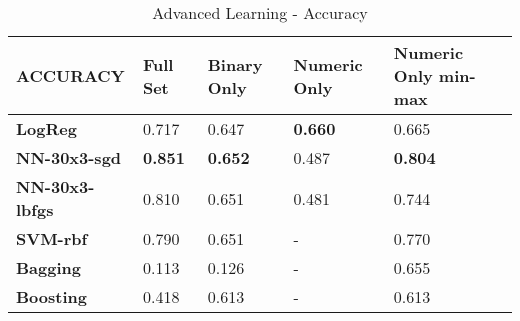 \documentclass[10pt, conference, compsocconf]{IEEEtran}
\begin{document}
\begin{center}
	\begin{table}[h]
		\centering \footnotesize
		\vspace{0.01cm}
		\caption{Advanced Learning - Accuracy}
		\hspace{1cm}
		\begin{tabularx}{\linewidth}{ l  X  X  X  X }
			\hline
			\textbf{ACCURACY} &	\textbf{Full Set}&	\textbf{Binary Only}&	\textbf{Numeric Only}&	\textbf{Numeric Only min-max} \\ \hline
			
			
			\textbf{LogReg}&	0.717&	0.647&	\textbf{0.660}&	0.665\\ \hline
			\textbf{NN-30x3-sgd}&	\textbf{0.851}&	\textbf{0.652}&	0.487&	\textbf{0.804}\\ \hline
			\textbf{NN-30x3-lbfgs}&	0.810&	0.651&	0.481&	0.744\\ \hline
			\textbf{SVM-rbf}&	0.790&	0.651&	-&	0.770\\ \hline
			\textbf{Bagging}&	0.113&	0.126&	-&	0.655\\ \hline
			\textbf{Boosting}&	0.418&	0.613&	-&	0.613 \\ \hline
			
			
		\end{tabularx}\newline
		\vspace{-0.05cm}
		\label{Table5}
	\end{table} \hfil
\end{center}
\end{document}
